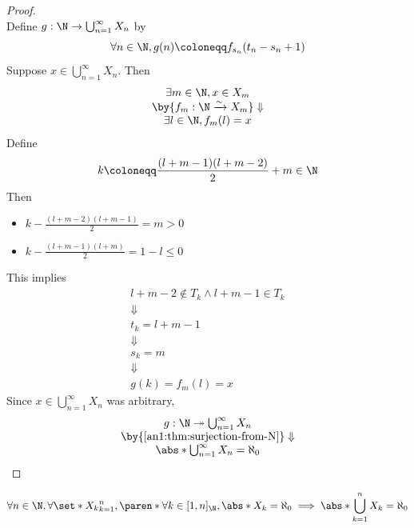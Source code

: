 \begin{proof}
\[  \]
  Define $g: \N \to \bigcup_{n = 1}^{\infty} X_{n}$ by
  \[
    \forall n \in \N, g(n) \coloneqq f_{s_{n}}(t_{n} - s_{n} + 1)
  \]
  Suppose $x \in \bigcup_{n = 1}^{\infty} X_{n}$. Then
  \[
    \begin{array}{c}
      \exists m \in \N, x \in X_{m}                                   \\
      \by{\ensuremath{f_{m}: \N \xrightarrow{\sim} X_{m}}} \Downarrow \\
      \exists l \in \N, f_{m}(l) = x                                  \\
    \end{array}
  \]
  Define
  \[
    k \coloneqq \frac{(l + m - 1)(l + m - 2)}{2} + m \in \N
  \]
  Then
  \begin{itemize}
    \item $k - \frac{(l + m - 2)(l + m - 1)}{2} = m > 0$
    \item $k - \frac{(l + m - 1)(l + m)}{2} = 1 - l \leq 0$
  \end{itemize}
  This implies
  \[
    \begin{array}{c}
      l + m - 2 \notin T_{k} \land l + m - 1 \in T_{k} \\
      \Downarrow                                       \\
      t_{k} = l + m - 1                                \\
      \Downarrow                                       \\
      s_{k} = m                                        \\
      \Downarrow                                       \\
      g(k) = f_{m}(l) = x
    \end{array}
  \]
  Since $x \in \bigcup_{n = 1}^{\infty} X_{n}$ was arbitrary,
  \[
    \begin{array}{c}
      g: \N \twoheadrightarrow \bigcup_{n = 1}^{\infty} X_{n} \\
      \by{\Cref{an1:thm:surjection-from-N}} \Downarrow        \\
      \abs*{\bigcup_{n = 1}^{\infty} X_{n}} = \aleph_{0}
    \end{array}
  \]
\end{proof}

\begin{corollary} \label{an1:cor:finite-union-of-countable-sets-is-countable}
  \[
    \forall n \in \N, \forall \set*{X_{k}}_{k = 1}^{n},
    \paren*{\forall k \in [1, n]_{\N}, \abs*{X_{k}} = \aleph_{0}}
    \implies \abs*{\bigcup_{k = 1}^{n} X_{k}} = \aleph_{0}
  \]
\end{corollary}

